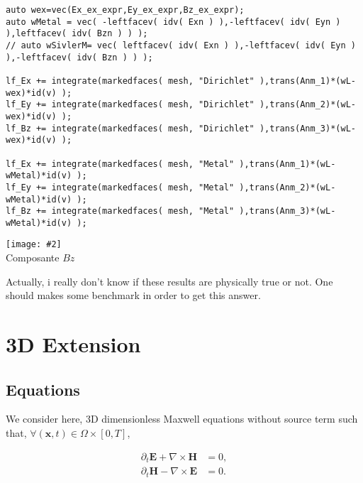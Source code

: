\documentclass[a4paper,oneside,10pt]{report}
\makeatletter
\newcommand\Image[3][]{%
  \tabular[b]{@{}c@{}}\texttt{[image: \#2]}\\
    #3
  \endtabular}
\makeatother
\begin{document}
\begin{center}
\begin{minipage}{\textwidth}
\begin{lstlisting}[label=code2,caption=Conditions aux bords]
auto wex=vec(Ex_ex_expr,Ey_ex_expr,Bz_ex_expr);
auto wMetal = vec( -leftfacev( idv( Exn ) ),-leftfacev( idv( Eyn ) ),leftfacev( idv( Bzn ) ) );
// auto wSivlerM= vec( leftfacev( idv( Exn ) ),-leftfacev( idv( Eyn ) ),-leftfacev( idv( Bzn ) ) );

lf_Ex += integrate(markedfaces( mesh, "Dirichlet" ),trans(Anm_1)*(wL-wex)*id(v) );
lf_Ey += integrate(markedfaces( mesh, "Dirichlet" ),trans(Anm_2)*(wL-wex)*id(v) );
lf_Bz += integrate(markedfaces( mesh, "Dirichlet" ),trans(Anm_3)*(wL-wex)*id(v) );

lf_Ex += integrate(markedfaces( mesh, "Metal" ),trans(Anm_1)*(wL-wMetal)*id(v) );
lf_Ey += integrate(markedfaces( mesh, "Metal" ),trans(Anm_2)*(wL-wMetal)*id(v) );
lf_Bz += integrate(markedfaces( mesh, "Metal" ),trans(Anm_3)*(wL-wMetal)*id(v) );
\end{lstlisting}
\end{minipage}
\end{center}


\begin{center}
\Image[width=0.7\linewidth]{./fig/Fig2.png}{Composante $Bz$}
\end{center}
Actually, i really don't know if these results are physically true or not. One should makes some benchmark in order to get this answer.
\chapter{3D Extension}
\section{Equations}
We consider here, 3D dimensionless Maxwell equations without source term such that, $\forall (\mathbf{x},t) \in \Omega \times [0,T]$,


\begin{equation}
\begin{aligned}
\label{eq:1}
\partial_t \mathbf{E} + \nabla \times \mathbf{H} &= 0,\\
\partial_t \mathbf{H} - \nabla \times \mathbf{E} &= 0.
\end{aligned}
\end{equation}
\end{document}
